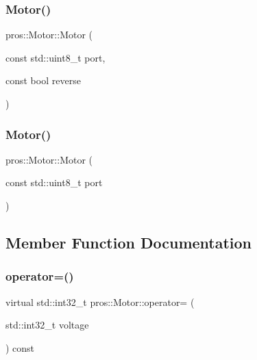 \mbox{\label{classpros_1_1Motor_a822e0023951996ca7eff13ffe9cf953d}} 
\subsubsection{\texorpdfstring{Motor()}{Motor()}\hspace{0.1cm}{\footnotesize\ttfamily [4/5]}}
{\footnotesize\ttfamily pros\+::\+Motor\+::\+Motor (\begin{DoxyParamCaption}\item[{const std\+::uint8\+\_\+t}]{port,  }\item[{const bool}]{reverse }\end{DoxyParamCaption})\hspace{0.3cm}{\ttfamily [explicit]}}

\mbox{\label{classpros_1_1Motor_a767b4ad39251b8e8411fae17a35b24ba}} 
\subsubsection{\texorpdfstring{Motor()}{Motor()}\hspace{0.1cm}{\footnotesize\ttfamily [5/5]}}
{\footnotesize\ttfamily pros\+::\+Motor\+::\+Motor (\begin{DoxyParamCaption}\item[{const std\+::uint8\+\_\+t}]{port }\end{DoxyParamCaption})\hspace{0.3cm}{\ttfamily [explicit]}}



\subsection{Member Function Documentation}
\mbox{\label{classpros_1_1Motor_a4cf8a9518eb6cd268d27151f0df7fd38}} 
\subsubsection{\texorpdfstring{operator=()}{operator=()}}
{\footnotesize\ttfamily virtual std\+::int32\+\_\+t pros\+::\+Motor\+::operator= (\begin{DoxyParamCaption}\item[{std\+::int32\+\_\+t}]{voltage }\end{DoxyParamCaption}) const\hspace{0.3cm}{\ttfamily [virtual]}}



